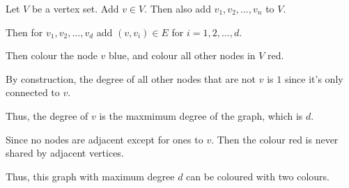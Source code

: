 \begin{soln}
	Let \(V\) be a vertex set. Add \(v \in V\). Then also add \(v_1, v_2, \dots, v_n\) to \(V\).

	Then for \(v_1, v_2, \dots, v_d\) add \((v, v_i) \in E\) for \(i = 1, 2, \dots, d\).

	Then colour the node \(v\) blue, and colour all other nodes in \(V\) red.

	By construction, the degree of all other nodes that are not \(v\) is \(1\) since it's only connected to \(v\).

	Thus, the degree of \(v\) is the maxmimum degree of the graph, which is \(d\).

	Since no nodes are adjacent except for ones to \(v\). Then the colour red is never shared by adjacent vertices.

	Thus, this graph with maximum degree \(d\) can be coloured with two colours.

\end{soln}
